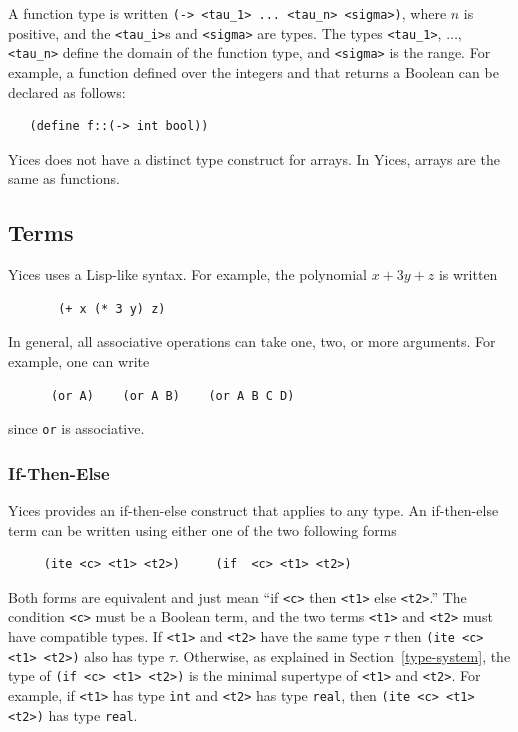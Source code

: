 \documentclass[11pt,twoside,fleqn,openright,titlepage]{cslreport}
\begin{document}
A function type is written \texttt{(-> <tau\_1> ...  <tau\_n>
  <sigma>)}, where $n$ is positive, and the \texttt{<tau\_i>}s and
\texttt{<sigma>} are types.  The types \texttt{<tau\_1>}, $\ldots$,
\texttt{<tau\_n>} define the domain of the function type, and
\texttt{<sigma>} is the range.  For example, a function defined over
the integers and that returns a Boolean can be declared as follows:
\begin{small}
\begin{verbatim}
   (define f::(-> int bool))
\end{verbatim}
\end{small}

\medskip\noindent Yices does not  have a distinct type construct for
arrays. In Yices, arrays are the same as functions.


\subsection{Terms}

Yices uses a Lisp-like syntax. For example, the polynomial $x + 3y +
z$ is written
\begin{small}
\begin{verbatim}
       (+ x (* 3 y) z)
\end{verbatim}
\end{small}
In general, all associative operations can take one, two, or more
arguments. For example, one can write
\begin{small}
\begin{verbatim}
      (or A)    (or A B)    (or A B C D)
\end{verbatim}
\end{small}
since \texttt{or} is associative.


\subsubsection*{If-Then-Else}

Yices provides an if-then-else construct that applies to any type.  An
if-then-else term can be written using either one of the two following
forms
\begin{small}
\begin{verbatim}
     (ite <c> <t1> <t2>)     (if  <c> <t1> <t2>)
\end{verbatim}
\end{small}
Both forms are equivalent and just mean ``if \texttt{<c>} then
\texttt{<t1>} else \texttt{<t2>}.''  The condition \texttt{<c>} must
be a Boolean term, and the two terms \texttt{<t1>} and \texttt{<t2>}
must have compatible types. If \texttt{<t1>} and \texttt{<t2>} have
the same type $\tau$ then \texttt{(ite <c> <t1> <t2>)} also has type
$\tau$.  Otherwise, as explained in Section~\ref{type-system}, the
type of \texttt{(if <c> <t1> <t2>)} is the minimal supertype of
\texttt{<t1>} and \texttt{<t2>}.  For example, if \texttt{<t1>} has
type \texttt{int} and \texttt{<t2>} has type \texttt{real}, then
\texttt{(ite <c> <t1> <t2>)} has type \texttt{real}.
\end{document}
